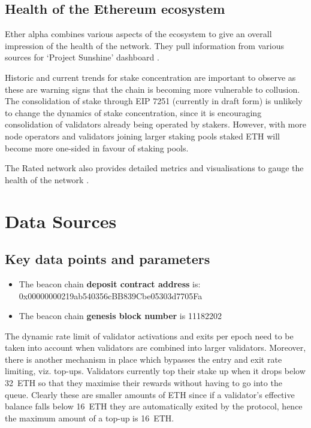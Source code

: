 \documentclass[UTF8]{article}
\begin{document}
\subsection{Health of the Ethereum ecosystem}
Ether alpha combines various aspects of the ecosystem to give an overall impression of the health of the network. They pull information from various sources for `Project Sunshine' dashboard \cite{easunshine}. 

Historic and current trends for stake concentration are important to observe as these are warning signs that the chain is becoming more vulnerable to collusion. The consolidation of stake through EIP 7251 (currently in draft form) \cite{Neuder2023c} is unlikely to change the dynamics of stake concentration, since it is encouraging consolidation of validators already being operated by stakers. However, with more node operators and validators joining larger staking pools staked ETH will become more one-sided in favour of staking pools. 

The Rated network also provides detailed metrics and visualisations to gauge the health of the network \cite{Rated2023a}. 

\section{Data Sources}
\label{sec:sources}
\subsection{Key data points and parameters}
\begin{itemize}
\item The beacon chain \textbf{deposit contract address} is: 0x00000000219ab540356cBB839Cbe05303d7705Fa 
\item The beacon chain \textbf{genesis block number} is 11182202
\end{itemize}

The dynamic rate limit of validator activations and exits per epoch need to be taken into account when validators are combined into larger validators. Moreover, there is another mechanism in place which bypasses the entry and exit rate limiting, viz. top-ups. Validators currently top their stake up when it drops below 32~ETH so that they maximise their rewards without having to go into the queue. Clearly these are smaller amounts of ETH since if a validator's effective balance falls below 16~ETH they are automatically exited by the protocol, hence the maximum amount of a top-up is 16~ETH.
\end{document}
